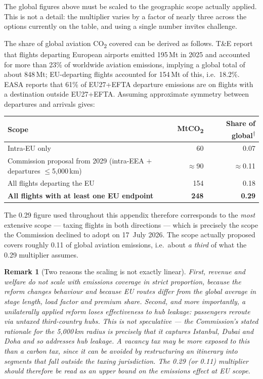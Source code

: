 \documentclass[11pt]{article}
\newtheorem{remark}{Remark}
\newcommand{\derived}{\textsuperscript{$\dagger$}}
\begin{document}
The global figures above must be scaled to the geographic scope actually
applied. This is not a detail: the multiplier varies by a factor of nearly three
across the options currently on the table, and using a single number invites
challenge.

The share of global aviation CO\textsubscript{2} covered can be derived as
follows. T\&E report that flights departing European airports emitted 195\,Mt in
2025 and accounted for more than 23\% of worldwide aviation emissions, implying
a global total of about 848\,Mt; EU-departing flights accounted for 154\,Mt of
this, i.e.\ 18.2\%. EASA reports that 61\% of EU27+EFTA departure emissions are
on flights with a destination outside EU27+EFTA. Assuming approximate symmetry
between departures and arrivals gives:

\begin{center}
\begin{tabular}{@{}p{8.4cm}rr@{}}
\toprule
Scope & MtCO\textsubscript{2} & Share of global\derived{} \\
\midrule
Intra-EU only & 60 & 0.07 \\
Commission proposal from 2029 (intra-EEA $+$ departures $\leq$5{,}000\,km) & $\approx$90 & $\approx$0.11 \\
All flights departing the EU & 154 & 0.18 \\
\textbf{All flights with at least one EU endpoint} & \textbf{248} & \textbf{0.29} \\
\bottomrule
\end{tabular}
\end{center}

The 0.29 figure used throughout this appendix therefore corresponds to the
\emph{most} extensive scope --- taxing flights in both directions --- which is
precisely the scope the Commission declined to adopt on 17~July 2026. The scope
actually proposed covers roughly 0.11 of global aviation emissions, i.e.\ about
\emph{a third} of what the 0.29 multiplier assumes.

\begin{remark}[Two reasons the scaling is not exactly linear]
First, revenue and welfare do not scale with emissions coverage in strict
proportion, because the reform changes behaviour and because EU routes differ
from the global average in stage length, load factor and premium share.
Second, and more importantly, a unilaterally applied reform loses effectiveness
to \emph{hub leakage}: passengers reroute via untaxed third-country hubs. This
is not speculative --- the Commission's stated rationale for the 5{,}000\,km
radius is precisely that it captures Istanbul, Dubai and Doha and so addresses
hub leakage. A vacancy tax may be more exposed to this than a carbon tax, since
it can be avoided by restructuring an itinerary into segments that fall outside
the taxing jurisdiction. The 0.29 (or 0.11) multiplier should therefore be read
as an \emph{upper bound} on the emissions effect at EU scope.
\end{remark}
\end{document}

